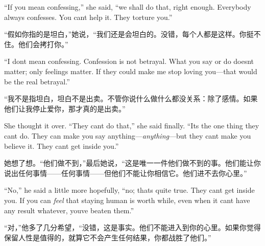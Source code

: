 \begin{paracol}{2}
\switchcolumn*

``If you mean confessing,'' she said, ``we shall do that, right enough.
Everybody always confesses. You can\textquotesingle t help it. They
torture you.''

\switchcolumn

``假如你指的是坦白，''她说，``我们还是会坦白的。没错，每个人都是这样。你挺不住。他们会拷打你。''

\switchcolumn*

``I don\textquotesingle t mean confessing. Confession is not betrayal.
What you say or do doesn\textquotesingle t matter; only feelings matter.
If they could make me stop loving you---that would be the real
betrayal.''

\switchcolumn

``我不是指坦白，坦白不是出卖。不管你说什么做什么都没关系：除了感情。如果他们让我停止爱你，那才真的是出卖。''

\switchcolumn*

She thought it over. ``They can\textquotesingle t do that,'' she said
finally. ``It\textquotesingle s the one thing they can\textquotesingle t
do. They can make you say anything---\emph{anything}---but they
can\textquotesingle t make you believe it. They can\textquotesingle t
get inside you.''

\switchcolumn

她想了想。``他们做不到，''最后她说，``这是唯一一件他们做不到的事。他们能让你说出任何事情——任何事情——但他们不能让你相信它。他们进不去你心里。''

\switchcolumn*

``No,'' he said a little more hopefully, ``no; that\textquotesingle s quite
true. They can\textquotesingle t get inside you. If you can \emph{feel}
that staying human is worth while, even when it can\textquotesingle t
have any result whatever, you\textquotesingle ve beaten them.''

\switchcolumn

``对，''他多了几分希望，``没错，这是事实。他们不能进入到你的心里。如果你觉得保留人性是值得的，就算它不会产生任何结果，你都战胜了他们。''

\switchcolumn*


\end{paracol}
